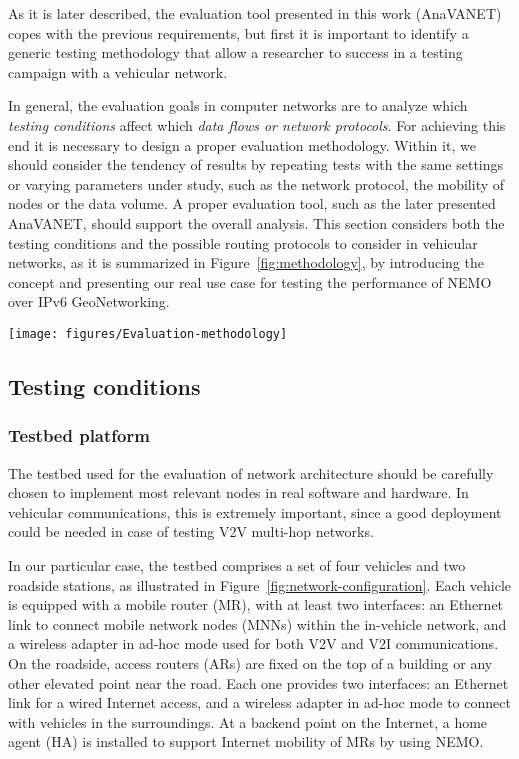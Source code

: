 \documentclass[fonts]{icst}
\begin{document}
As it is later described, the evaluation tool presented in this work (AnaVANET) copes with the previous requirements, but first it is important to identify a generic testing methodology that allow a researcher to success in a testing campaign with a vehicular network.

In general, the evaluation goals in computer networks are to analyze which \textit{testing conditions} affect which \textit{data flows or network protocols}. For achieving this end it is necessary to design a proper evaluation methodology. Within it, we should consider the tendency of results by repeating tests with the same settings or varying parameters under study, such as the network protocol, the mobility of nodes or the data volume. A proper evaluation tool, such as the later presented AnaVANET, should support the overall analysis.  This section considers both the testing conditions and the possible routing protocols to consider in vehicular networks, as it is summarized in Figure~\ref{fig:methodology}, by introducing the concept and presenting our real use case for testing the performance of NEMO over IPv6 GeoNetworking. 

\begin{figure*}[bhpt]
   \begin{center}
       \texttt{[image: figures/Evaluation-methodology]}
  \caption{Evaluation methodology}
  \label{fig:methodology}
  \end{center}
\end{figure*}

\subsection{Testing conditions}

\subsubsection{Testbed platform} 

The testbed used for the evaluation of network architecture should be carefully chosen to implement most relevant nodes in real software and hardware. In vehicular communications, this is extremely important, since a good deployment could be needed in case of testing V2V multi-hop networks.

In our particular case, the testbed comprises a set of four vehicles and two roadside stations, as illustrated in Figure~\ref{fig:network-configuration}. Each vehicle is equipped with a mobile
router (MR), with at least two interfaces: an Ethernet link to connect mobile
network nodes (MNNs) within the in-vehicle network, and a wireless adapter in ad-hoc mode
used for both V2V and V2I communications. On the roadside, access routers (ARs) are fixed on the top of a building or any other elevated point near the road. Each one provides two interfaces: an Ethernet link for a wired Internet access, and a wireless adapter in
ad-hoc mode to connect with vehicles in the surroundings. At a backend point on the Internet, a home agent (HA) is installed to support Internet mobility of MRs by using NEMO. 
\end{document}
